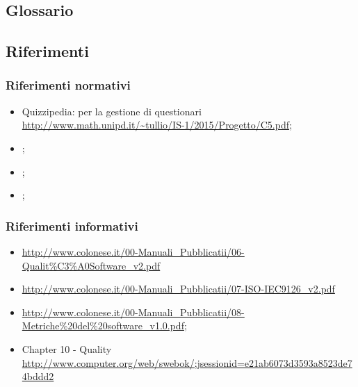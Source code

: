 \documentclass[a4paper, titlepage]{article}
\begin{document}
\subsection{Glossario}
\GLOSSARIO

\subsection{Riferimenti}
\subsubsection{Riferimenti normativi}
\begin{itemize}
\item {} Quizzipedia:  per la gestione di questionari
\newline \url{http://www.math.unipd.it/~tullio/IS-1/2015/Progetto/C5.pdf};
\item {} \NdPdoc;
\item {} \ARdoc;
\item {} \PdPdoc;
\end{itemize}

\subsubsection{Riferimenti informativi}
\begin{itemize}
\item {}
	\newline \url{http://www.colonese.it/00-Manuali_Pubblicatii/06-Qualit%C3%A0Software_v2.pdf}
	\item {} 
	\newline \url{http://www.colonese.it/00-Manuali_Pubblicatii/07-ISO-IEC9126_v2.pdf}
	\item {}
	\newline \url{http://www.colonese.it/00-Manuali_Pubblicatii/08-Metriche%20del%20software_v1.0.pdf};
	\item {} Chapter 10 -  Quality
	\newline \url{http://www.computer.org/web/swebok/;jsessionid=e21ab6073d3593a8523de74bddd2}
\end{itemize}
\end{document}
